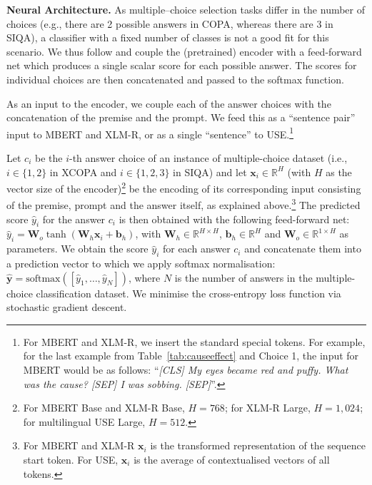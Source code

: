 \documentclass[11pt,a4paper]{article}
\begin{document}
\vspace{1.4mm}
\noindent \textbf{Neural Architecture.} 
As multiple--choice selection tasks differ in the number of choices (e.g., there are 2 possible answers in COPA, whereas there are 3 in SIQA), a classifier with a fixed number of classes is not a good fit for this scenario. We thus follow \citet{Sap:2019siqa} and couple the (pretrained) encoder with a feed-forward net which produces a single scalar score for each possible answer. The scores for individual choices are then concatenated and passed to the softmax function. 

As an input to the encoder, we couple each of the answer choices with the concatenation of the premise and the prompt. We feed this as a ``sentence pair'' input to MBERT and XLM-R, or as a single ``sentence'' to USE.\footnote{For MBERT and XLM-R, we insert the standard special tokens. For example, for the last example from Table~\ref{tab:causeeffect} and Choice 1, the input for MBERT would be as follows: ``\textit{[CLS] My eyes became red and puffy. What was the cause? [SEP] I was sobbing. [SEP]}''.} 

Let $c_i$ be the $i$-th answer choice of an instance of multiple-choice dataset (i.e., $i \in \{1, 2\}$ in XCOPA and $i \in \{1, 2, 3\}$ in SIQA) and let $\mathbf{x}_i \in \mathbb{R}^H$ (with $H$ as the vector size of the encoder)\footnote{For MBERT Base and XLM-R Base, $H = 768$; for XLM-R Large, $H=1,024$; for multilingual USE Large, $H = 512$.} be the encoding of its corresponding input consisting of the premise, prompt and the answer itself, as explained above.\footnote{For MBERT and XLM-R $\mathbf{x}_i$ is the transformed representation of the sequence start token. For USE, $\mathbf{x}_i$ is the average of contextualised vectors of all tokens.} The predicted score $\hat{y}_i$ for the answer $c_i$ is then obtained with the following feed-forward net: $\hat{y}_i = \mathbf{W}_o \tanh \left(\mathbf{W}_h \mathbf{x}_i + \mathbf{b}_h\right)$,
with $\mathbf{W}_h \in \mathbb{R}^{H \times H}$, $\mathbf{b}_h \in \mathbb{R}^{H}$ and $\mathbf{W}_o \in \mathbb{R}^{1 \times H}$ as parameters. We obtain the score $\hat{y}_i$ for each answer $c_i$ and concatenate them into a prediction vector to which we apply softmax normalisation: $\hat{\mathbf{y}} = \mathrm{softmax}([\hat{y}_1, \dots, \hat{y}_N])$, where $N$ is the number of answers in the multiple-choice classification dataset. We minimise the cross-entropy loss function via stochastic gradient descent.  
\end{document}
